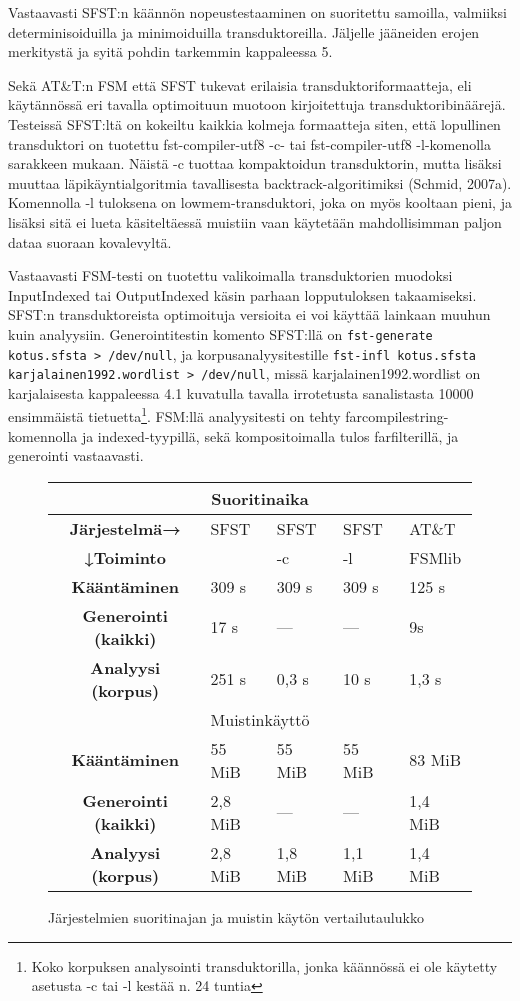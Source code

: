 \documentclass[free]{flammie}
\begin{document}
Vastaavasti SFST:n käännön nopeustestaaminen on suoritettu samoilla, valmiiksi determinisoiduilla ja minimoiduilla transduktoreilla. Jäljelle jääneiden erojen
merkitystä ja syitä pohdin tarkemmin kappaleessa 5.

Sekä AT\&T:n FSM että SFST tukevat erilaisia transduktoriformaatteja, eli käytännössä eri tavalla optimoituun muotoon kirjoitettuja transduktoribinäärejä. Testeissä SFST:ltä on kokeiltu kaikkia kolmeja formaatteja siten, että lopullinen transduktori on tuotettu fst-compiler-utf8 -c- tai fst-compiler-utf8
-l-komenolla sarakkeen mukaan. Näistä -c tuottaa kompaktoidun transduktorin, mutta lisäksi muuttaa läpikäyntialgoritmia tavallisesta backtrack-algoritimiksi
(Schmid, 2007a). Komennolla -l tuloksena on lowmem-transduktori, joka on
myös kooltaan pieni, ja lisäksi sitä ei lueta käsiteltäessä muistiin vaan käytetään
mahdollisimman paljon dataa suoraan kovalevyltä.

Vastaavasti FSM-testi on tuotettu valikoimalla transduktorien muodoksi
InputIndexed tai OutputIndexed käsin parhaan lopputuloksen takaamiseksi. SFST:n
transduktoreista optimoituja versioita ei voi käyttää lainkaan muuhun kuin
analyysiin.  Generointitestin komento SFST:llä on \texttt{fst-generate kotus.sfsta >
/dev/null}, ja korpusanalyysitestille \texttt{fst-infl kotus.sfsta
karjalainen1992.wordlist > /dev/null}, missä karjalainen1992.wordlist on
karjalaisesta kappaleessa 4.1 kuvatulla tavalla irrotetusta sanalistasta 10000
ensimmäistä tietuetta\footnote{Koko korpuksen analysointi transduktorilla, jonka
käännössä ei ole käytetty asetusta -c tai -l kestää n. 24 tuntia}. FSM:llä
analyysitesti on tehty farcompilestring-komennolla ja indexed-tyypillä, sekä
kompositoimalla tulos farfilterillä, ja generointi vastaavasti.

\begin{figure}
    \caption{Järjestelmien suoritinajan ja muistin käytön vertailutaulukko
    \label{table:tere}}
    \begin{tabular}{c|l|l|l||l}
        \hline
        \multicolumn{5}{c}{Suoritinaika} \\
        \hline
        \bf Järjestelmä→ & SFST & SFST & SFST & AT\&T \\
        \bf ↓Toiminto & & -c & -l & FSMlib \\
        \hline
        \bf Kääntäminen & 309 s & 309 s & 309 s & 125 s \\
        \hline
        \bf Generointi (kaikki) & 17 s & — & — & 9s \\
        \bf Analyysi (korpus) & 251 s & 0,3 s & 10 s & 1,3 s \\
        \hline
        \multicolumn{5}{c}{Muistinkäyttö} \\
        \hline
        \bf Kääntäminen & 55 MiB & 55 MiB & 55 MiB & 83 MiB \\
        \hline
        \bf Generointi (kaikki) & 2,8 MiB & — & — & 1,4 MiB \\
        \bf Analyysi (korpus) & 2,8 MiB & 1,8 MiB & 1,1 MiB & 1,4 MiB \\
        \hline
    \end{tabular}
\end{figure}
\end{document}
